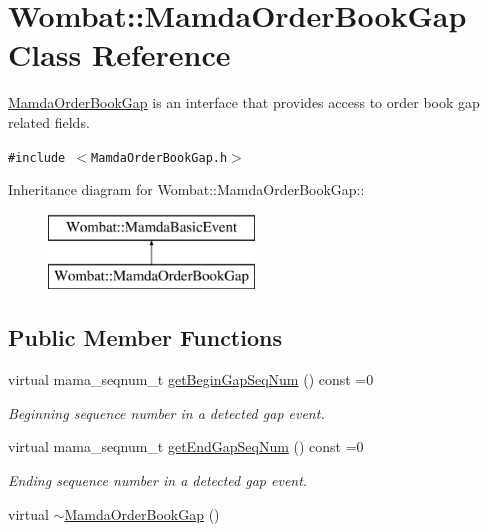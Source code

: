 \hypertarget{classWombat_1_1MamdaOrderBookGap}{
\section{Wombat::Mamda\-Order\-Book\-Gap Class Reference}
\label{classWombat_1_1MamdaOrderBookGap}
}
\hyperlink{classWombat_1_1MamdaOrderBookGap}{Mamda\-Order\-Book\-Gap} is an interface that provides access to order book gap related fields.  


{\tt \#include $<$Mamda\-Order\-Book\-Gap.h$>$}

Inheritance diagram for Wombat::Mamda\-Order\-Book\-Gap::\begin{figure}[H]
\begin{center}
\leavevmode
\includegraphics[height=2cm]{classWombat_1_1MamdaOrderBookGap}
\end{center}
\end{figure}
\subsection*{Public Member Functions}
\begin{CompactItemize}
\item 
virtual mama\_\-seqnum\_\-t \hyperlink{classWombat_1_1MamdaOrderBookGap_0875bc220d82aaec977cd1dbb006cc0f}{get\-Begin\-Gap\-Seq\-Num} () const =0
\begin{CompactList}\small\item\em Beginning sequence number in a detected gap event. \item\end{CompactList}\item 
virtual mama\_\-seqnum\_\-t \hyperlink{classWombat_1_1MamdaOrderBookGap_3d69b4d1f1b9c8ae0c36d261fca578f8}{get\-End\-Gap\-Seq\-Num} () const =0
\begin{CompactList}\small\item\em Ending sequence number in a detected gap event. \item\end{CompactList}\item 
virtual \hyperlink{classWombat_1_1MamdaOrderBookGap_0941369e62306f8b3ea72144f75a8cd4}{$\sim$Mamda\-Order\-Book\-Gap} ()
\end{CompactItemize}


